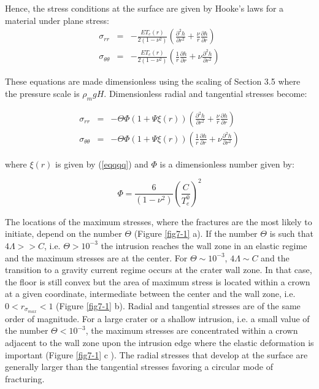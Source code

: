 \begin{article}
\begin{enumerate}
Hence, the stress conditions at the surface are given by Hooke's laws for a material under plane stress:
\begin{eqnarray}
\sigma_{rr}&=&-\frac{E T_{e}(r)}{2(1-\nu^2)}\left (\frac{\partial^{2} h}{\partial r^{2}} +\frac{\nu}{r}\frac{\partial h}{\partial r} \right)\\
\sigma_{\theta\theta}&=&-\frac{E T_{e}(r)}{2(1-\nu^2)}\left (\frac{1}{r}\frac{\partial h}{\partial r}+\nu \frac{\partial^{2}h}{\partial r^2}\right)
\end{eqnarray}

These equations are made dimensionless using the scaling of Section 3.5 where the pressure scale is $\rho_m g H$. Dimensionless radial and tangential stresses become:

\begin{eqnarray}
\sigma_{rr}&=&- \Theta \Phi \left(1+\Psi \xi(r)\right) \left ( \frac{\partial^{2} h}{\partial r^{2}} +\frac{\nu}{r}\frac{\partial h}{\partial r} \right) \\
\sigma_{\theta\theta}&=&- \Theta \Phi \left(1+\Psi \xi(r)\right) \left (\frac{1}{r}\frac{\partial h}{\partial r}+\nu \frac{\partial^{2}h}{\partial r^2}\right)
\end{eqnarray}

where $\xi(r)$ is given by (\ref{eqqqq}) and $\Phi$ is a dimensionless number given by:

\begin{equation}
\Phi= \frac{6 }{(1-\nu^2)}\left( \frac{C}{T_{e}^0} \right)^{2}
\end{equation}

The locations of the maximum stresses, where the fractures are the most likely to initiate, depend on the number $\Theta$ (Figure \ref{fig7-1} a). If the number $\Theta$ is such that $4\Lambda>>C$, i.e. $\Theta>10^{-3}$ the intrusion reaches the wall zone in an elastic regime and the maximum stresses are at the center. For $\Theta\sim10^{-3}$, $4\Lambda \sim C$ and the transition to a gravity current regime occurs at the crater wall zone. In that case, the floor is still convex but the area of maximum stress is located within a crown at a given coordinate, intermediate between the center and the wall zone, i.e. $0<r_{\sigma_{max}}<1$ (Figure \ref{fig7-1} b). Radial and tangential stresses are of the same order of magnitude. For a large crater or a shallow intrusion, i.e. a small value of the number $\Theta<10^{-3}$, the maximum stresses are concentrated within a crown adjacent to the wall zone upon the intrusion edge where the elastic deformation is important (Figure \ref{fig7-1} c ). The radial stresses that develop at the surface are generally larger than the tangential stresses favoring a circular mode of fracturing.



\end{enumerate}
\end{article}
